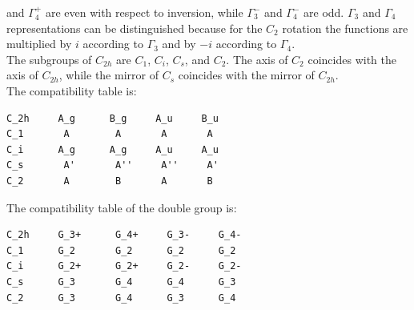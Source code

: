 \documentclass[12pt,a4paper]{article}
\begin{document}
and $\Gamma_4^+$ are even with respect to inversion, while
$\Gamma_3^-$ and $\Gamma_4^-$ are odd. $\Gamma_3$ and $\Gamma_4$ 
representations can be distinguished because for the $C_2$ rotation
the functions are multiplied by $i$ according to $\Gamma_3$ and 
by $-i$ according to $\Gamma_4$. \\
The subgroups of $C_{2h}$ are $C_1$, $C_i$, $C_s$, and $C_2$. The
axis of $C_2$ coincides with the axis of $C_{2h}$, while the 
mirror of $C_s$ coincides with the mirror of $C_{2h}$.\\
The compatibility table is:
\begin{verbatim}
C_2h     A_g      B_g     A_u     B_u
C_1       A        A       A       A
C_i      A_g      A_g     A_u     A_u
C_s       A'       A''     A''     A'
C_2       A        B       A       B
\end{verbatim}
The compatibility table of the double group is:
\begin{verbatim}
C_2h     G_3+      G_4+     G_3-     G_4- 
C_1      G_2       G_2      G_2      G_2
C_i      G_2+      G_2+     G_2-     G_2-
C_s      G_3       G_4      G_4      G_3
C_2      G_3       G_4      G_3      G_4
\end{verbatim}
\end{document}
